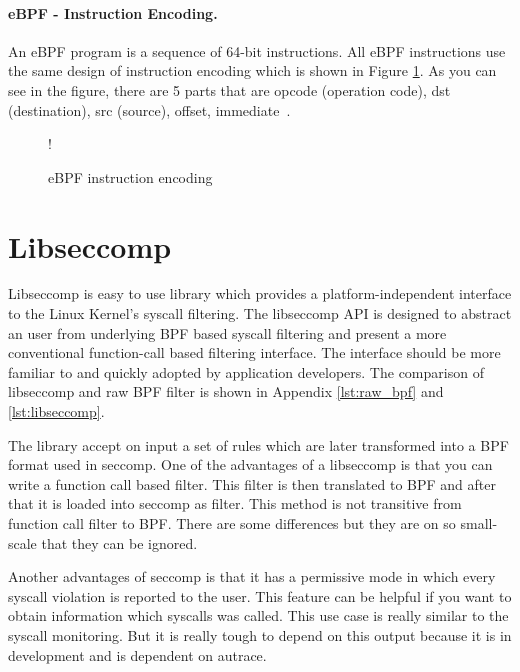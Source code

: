 \paragraph{eBPF - Instruction Encoding. }
An eBPF program is a sequence of 64-bit instructions.
All eBPF instructions use the same design of instruction encoding which is shown in Figure \ref{fig:tikz:eBPF_instruction}.
As you can see in the figure, there are 5 parts that are opcode (operation code), dst (destination), src (source), offset, immediate~\cite{kernel_bpf_specification}.

\begin{figure}[h]
  \centering
  \resizebox {\textwidth} {!} {
	
  }
  \caption{eBPF instruction encoding}
  \label{fig:tikz:eBPF_instruction}
\end{figure}

\section{Libseccomp}
Libseccomp \cite{libseccomp_git} is easy to use library which provides a platform-independent interface to the Linux Kernel's syscall filtering.
The libseccomp API is designed to abstract an user from underlying BPF based syscall filtering and present a more conventional function-call based filtering interface.
The interface should be more familiar to and quickly adopted by application developers.
The comparison of libseccomp and raw BPF filter is shown in Appendix \ref{lst:raw_bpf} and \ref{lst:libseccomp}.

The library accept on input a set of rules which are later transformed into a BPF format used in seccomp.
One of the advantages of a libseccomp is that you can write a function call based filter.
This filter is then translated to BPF and after that it is loaded into seccomp as filter.
This method is not transitive from function call filter to BPF.
There are some differences but they are on so small-scale that they can be ignored.

Another advantages of seccomp is that it has a permissive mode in which every syscall violation is reported to the user.
This feature can be helpful if you want to obtain information which syscalls was called.
This use case is really similar to the syscall monitoring.
But it is really tough to depend on this output because it is in development and
is dependent on autrace.


